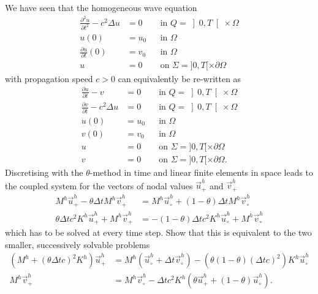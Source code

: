 \documentclass[10pt,letterpaper]{scrartcl}
\begin{document}
We have seen that the homogeneous wave equation
\begin{equation}\tag{W}\label{eq:wave}
\begin{aligned}
\frac{\partial^2 u}{\partial t^2} - c^2 \Delta u &= 0 && \text{in } Q = \left] 0,T\right[ \times \Omega\\
u(0) &= u_0 && \text{in } \Omega\\
\frac{\partial u}{\partial t}(0) &= v_0 && \text{in } \Omega\\
u &= 0 && \text{on } \Sigma = ]0,T[ \times \partial \Omega
\end{aligned}
\end{equation}
with propagation speed $c>0$ can equivalently be re-written as
\begin{equation}\tag{W'}\label{eq:waveSystem}
\begin{aligned}
\frac{\partial u}{\partial t} - v &= 0 && \text{in } Q = \left] 0,T\right[ \times \Omega\\
\frac{\partial v}{\partial t} - c^2 \Delta u &= 0 && \text{in } Q = \left] 0,T\right[ \times \Omega\\
u(0) &= u_0 && \text{in } \Omega\\
v(0) &= v_0 && \text{in } \Omega\\
u &= 0 && \text{on } \Sigma = ]0,T[ \times \partial \Omega\\
v &= 0 && \text{on } \Sigma = ]0,T[ \times \partial \Omega.
\end{aligned}
\end{equation}
Discretising with the $\theta$-method in time and linear finite elements in space leads to the coupled system for the vectors of nodal values $\vec{u}^h_+$ and $\vec{v}^h_+$
\begin{align*}
M^h \vec{u}^h_+ - \theta \Delta t M^h \vec{v}^h_+ &= M^h \vec{u}^h_\circ + (1-\theta) \Delta t M^h\vec{v}^h_\circ\\
\theta \Delta t c^2 K^h \vec{u}^h_+ + M^h \vec{v}^h_+ &= -(1-\theta) \Delta t c^2 K^h \vec{u}^h_\circ + M^h \vec{v}^h_\circ
\end{align*}
which has to be solved at every time step. Show that this is equivalent to the two smaller, successively solvable problems
\begin{align*}
\left(M^h + \left(\theta \Delta t c\right)^2 K^h\right) \vec{u}^h_+ &= M^h \left( \vec{u}^h_\circ + \Delta t \vec{v}^h_\circ\right) - \left( \theta\left(1-\theta\right) \left(\Delta t c\right)^2 \right)K^h \vec{u}^h_\circ\\
M^h \vec{v}^h_+ &= M^h \vec{v}^h_\circ - \Delta t c^2 K^h \left( \theta \vec{u}^h_+ + \left(1-\theta\right) \vec{u}^h_\circ\right).
\end{align*}
\end{document}
